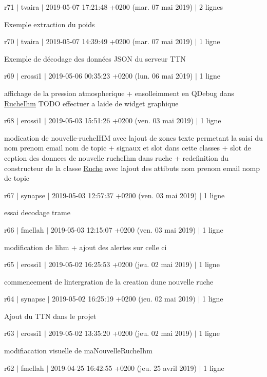 r71 $\vert$ tvaira $\vert$ 2019-\/05-\/07 17\+:21\+:48 +0200 (mar. 07 mai 2019) $\vert$ 2 lignes

Exemple extraction du poids

r70 $\vert$ tvaira $\vert$ 2019-\/05-\/07 14\+:39\+:49 +0200 (mar. 07 mai 2019) $\vert$ 1 ligne

Exemple de décodage des données J\+S\+ON du serveur T\+TN

r69 $\vert$ erossi1 $\vert$ 2019-\/05-\/06 00\+:35\+:23 +0200 (lun. 06 mai 2019) $\vert$ 1 ligne

affichage de la pression atmospherique + ensolleimment en Q\+Debug dans \hyperlink{class_ruche_ihm}{Ruche\+Ihm} T\+O\+DO effectuer a l\textquotesingle{}aide de widget graphique

r68 $\vert$ erossi1 $\vert$ 2019-\/05-\/03 15\+:51\+:26 +0200 (ven. 03 mai 2019) $\vert$ 1 ligne

modication de nouvelle-\/ruche\+I\+HM avec l\textquotesingle{}ajout de zones texte permetant la saisi du nom prenom email nom de topic + signaux et slot dans cette classes + slot de ception des donnees de nouvelle ruche\+Ihm dans ruche + redefinition du constructeur de la classe \hyperlink{class_ruche}{Ruche} avec l\textquotesingle{}ajout des attibuts nom prenom email nomp de topic

r67 $\vert$ synapse $\vert$ 2019-\/05-\/03 12\+:57\+:37 +0200 (ven. 03 mai 2019) $\vert$ 1 ligne

essai decodage trame

r66 $\vert$ fmellah $\vert$ 2019-\/05-\/03 12\+:15\+:07 +0200 (ven. 03 mai 2019) $\vert$ 1 ligne

modification de l\textquotesingle{}ihm + ajout des alertes sur celle ci

r65 $\vert$ erossi1 $\vert$ 2019-\/05-\/02 16\+:25\+:53 +0200 (jeu. 02 mai 2019) $\vert$ 1 ligne

commencement de l\textquotesingle{}intergration de la creation d\textquotesingle{}une nouvelle ruche

r64 $\vert$ synapse $\vert$ 2019-\/05-\/02 16\+:25\+:19 +0200 (jeu. 02 mai 2019) $\vert$ 1 ligne

Ajout du T\+TN dans le projet

r63 $\vert$ erossi1 $\vert$ 2019-\/05-\/02 13\+:35\+:20 +0200 (jeu. 02 mai 2019) $\vert$ 1 ligne

modifiacation visuelle de ma\+Nouvelle\+Ruche\+Ihm

r62 $\vert$ fmellah $\vert$ 2019-\/04-\/25 16\+:42\+:55 +0200 (jeu. 25 avril 2019) $\vert$ 1 ligne

